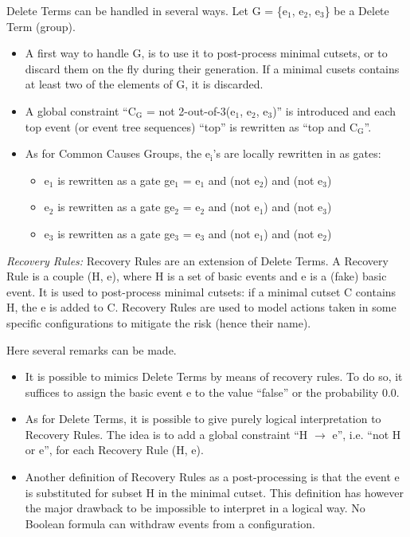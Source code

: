 \documentclass[11pt]{article}
\begin{document}
Delete Terms can be handled in several ways. Let G = \{e\(_{\text{1}}\), e\(_{\text{2}}\),
e\(_{\text{3}}\)\} be a Delete Term (group).

\begin{itemize}
\item A first way to handle G, is to use it to post-process minimal
cutsets, or to discard them on the fly during their generation. If a
minimal cusets contains at least two of the elements of G, it is
discarded.

\item A global constraint ``C\(_{\text{G}}\) = not 2-out-of-3(e\(_{\text{1}}\), e\(_{\text{2}}\), e\(_{\text{3}}\))'' is
introduced and each top event (or event tree sequences) ``top'' is
rewritten as ``top and C\(_{\text{G}}\)''.

\item As for Common Causes Groups, the e\(_{\text{i}}\)'s are locally rewritten in as
gates:

\begin{itemize}
\item e\(_{\text{1}}\) is rewritten as a gate ge\(_{\text{1}}\) = e\(_{\text{1}}\) and (not e\(_{\text{2}}\)) and
(not e\(_{\text{3}}\))

\item e\(_{\text{2}}\) is rewritten as a gate ge\(_{\text{2}}\) = e\(_{\text{2}}\) and (not e\(_{\text{1}}\)) and
(not e\(_{\text{3}}\))

\item e\(_{\text{3}}\) is rewritten as a gate ge\(_{\text{3}}\) = e\(_{\text{3}}\) and (not e\(_{\text{1}}\)) and
(not e\(_{\text{2}}\))
\end{itemize}
\end{itemize}

\emph{Recovery Rules:} Recovery Rules are an extension of Delete Terms. A
Recovery Rule is a couple (H, e), where H is a set of basic events and e
is a (fake) basic event. It is used to post-process minimal cutsets: if
a minimal cutset C contains H, the e is added to C. Recovery Rules are
used to model actions taken in some specific configurations to mitigate
the risk (hence their name).

Here several remarks can be made.

\begin{itemize}
\item It is possible to mimics Delete Terms by means of recovery rules. To
do so, it suffices to assign the basic event e to the value ``false''
or the probability 0.0.

\item As for Delete Terms, it is possible to give purely logical
interpretation to Recovery Rules. The idea is to add a global
constraint ``H \(\rightarrow\) e'', i.e. ``not H or e'', for each Recovery Rule (H, e).

\item Another definition of Recovery Rules as a post-processing is that the
event e is substituted for subset H in the minimal cutset. This
definition has however the major drawback to be impossible to
interpret in a logical way. No Boolean formula can withdraw events
from a configuration.
\end{itemize}
\end{document}
